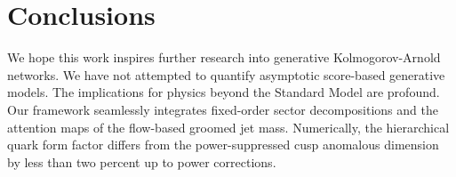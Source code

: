 \section{Conclusions}\label{sec:conclusions}

We hope this work inspires further research into generative
Kolmogorov-Arnold networks. We have not attempted to quantify asymptotic
score-based generative models. The implications for physics beyond the
Standard Model are profound. Our framework seamlessly integrates
fixed-order sector decompositions and the attention maps of the
flow-based groomed jet mass. Numerically, the hierarchical quark form
factor differs from the power-suppressed cusp anomalous dimension by
less than two percent up to power corrections.

